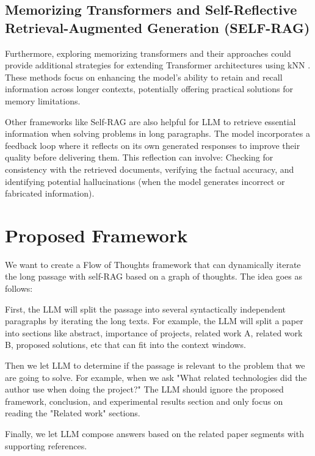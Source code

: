 \documentclass{article}
\begin{document}
\subsection{Memorizing Transformers and Self-Reflective Retrieval-Augmented Generation (SELF-RAG)}

Furthermore, exploring memorizing transformers and their approaches could provide additional strategies for extending Transformer architectures using kNN \cite{wu2022memorizingtransformers}. These methods focus on enhancing the model’s ability to retain and recall information across longer contexts, potentially offering practical solutions for memory limitations.

Other frameworks like Self-RAG \cite{asai2023selfraglearningretrievegenerate} are also helpful for LLM to retrieve essential information when solving problems in long paragraphs. The model incorporates a feedback loop where it reflects on its own generated responses to improve their quality before delivering them. This reflection can involve: Checking for consistency with the retrieved documents, verifying the factual accuracy, and identifying potential hallucinations (when the model generates incorrect or fabricated information).


\section{Proposed Framework}

We want to create a Flow of Thoughts framework that can dynamically iterate the long passage with self-RAG based on a graph of thoughts. The idea goes as follows:

First, the LLM will split the passage into several syntactically independent paragraphs by iterating the long texts. For example, the LLM will split a paper into sections like abstract, importance of projects, related work A, related work B, proposed solutions, etc that can fit into the context windows.

Then we let LLM to determine if the passage is relevant to the problem that we are going to solve. For example, when we ask "What related technologies did the author use when doing the project?" The LLM should ignore the proposed framework, conclusion, and experimental results section and only focus on reading the "Related work" sections.

Finally, we let LLM compose answers based on the related paper segments with supporting references.
\end{document}
